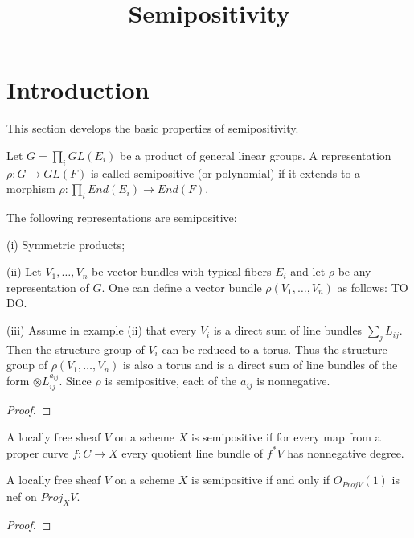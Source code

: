 


\newcommand{\todo}[1]{\footnote{\textbf{TODO.} #1}}


\title{Semipositivity}
\maketitle


\section{Introduction}
This section develops the basic properties of semipositivity.


\begin{definition}
Let $G=\prod_i GL(E_i)$ be a product of general linear groups. A representation $\rho:G\rightarrow GL(F)$ is called semipositive (or polynomial) if it extends to a morphism $\overline{\rho}:\prod_i End(E_i)\rightarrow End(F)$.
\end{definition}

\begin{lemma}
The following representations are semipositive:
\item[(i)] Symmetric products;
\item[(ii)] Let $V_1, \dots, V_n$ be vector bundles with typical fibers $E_i$ and let $\rho$ be any representation of $G$. One can define a vector bundle $\rho(V_1,\dots,V_n)$ as follows: TO DO.
\item[(iii)] Assume in example (ii) that every $V_i$ is a direct sum of line bundles $\sum_j L_{ij}$. Then the structure group of  $V_i$ can be reduced to a torus. Thus the structure group of $\rho(V_1,\dots, V_n)$ is also a torus and is a direct sum of line bundles of the form $\otimes L_{ij}^{a_{ij}}$. Since $\rho$ is semipositive, each of the $a_{ij}$ is nonnegative.
\end{lemma}


\begin{proof}

\end{proof}


\begin{definition}
A locally free sheaf $V$ on a scheme $X$ is semipositive if for every map from a proper curve $f:C\to X$ every quotient line bundle of $f^*V$ has nonnegative degree.
\end{definition}

\begin{lemma}
A locally free sheaf $V$ on a scheme $X$ is semipositive if and only if $O_{Proj V}(1)$ is nef on $Proj_XV$.
\end{lemma}
\begin{proof}

\end{proof}

